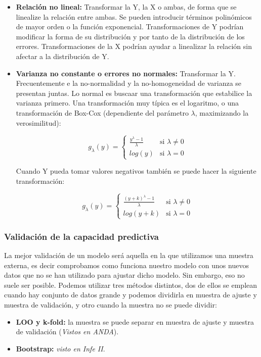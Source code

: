 \begin{itemize}
    \item \textbf{Relación no lineal: }Transformar la Y, la X o ambas, de forma que se linealize la relación entre ambas. Se pueden introducir términos polinómicos de mayor orden o la función exponencial.
    Transformaciones de Y podrían modificar la forma de su distribución y por tanto de la distribución de los errores. Transformaciones de la X podrían ayudar a linealizar la relación sin afectar a la distribución de Y.
    \item \textbf{Varianza no constante o errores no normales: }Transformar la Y. Frecuentemente e la no-normalidad y la no-homogeneidad de varianza se presentan juntas. Lo normal es buscaar una transformación que estabilice la varianza primero.
    Una transformación muy típica es el logaritmo, o una transformación de Box-Cox (dependiente del parámetro $\lambda$, maximizando la verosimilitud):

    $$
    g_\lambda(y)=\begin{cases}
        \frac{y^\lambda-1}{\lambda} & \text{si }\lambda\neq0\\
        log(y) & \text{si }\lambda=0
    \end{cases}
    $$

    Cuando Y pueda tomar valores negativos también se puede hacer la siguiente transformación:

    $$
    g_\lambda(y)=\begin{cases}
        \frac{(y+k)^\lambda-1}{\lambda} & \text{si }\lambda\neq0\\
        log(y+k) & \text{si }\lambda=0
    \end{cases}
    $$

\end{itemize}

\subsubsection{Validación de la capacidad predictiva}

La mejor validación de un modelo será aquella en la que utilizamos una muestra externa, es decir comprobamos como funciona nuestro modelo con unos nuevos datos que no se han utilizado para ajustar dicho modelo.
Sin embargo, eso no suele ser posible. Podemos utilizar tres métodos distintos, dos de ellos se emplean cuando hay conjunto de datos grande y podemos dividirla en muestra de ajuste y muestra de validación, y otro cuando la muestra no se puede dividir:

\begin{itemize}
    \item \textbf{LOO y k-fold:} la muestra se puede separar en muestra de ajuste y muestra de validación (\textit{Vistos en ANDA}).
    \item \textbf{Bootstrap: }\textit{visto en Infe II}.
\end{itemize}





